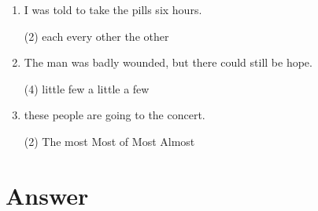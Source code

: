\begin{enumerate}
\item I was told to take the pills  \ttu six hours.
  \begin{tasks}(2)
    \task each \task every \task other \task the other
  \end{tasks}


\item The man was badly wounded, but there could still be  \ttu  hope.
  \begin{tasks}(4)
    \task little \task few \task a little \task a few
  \end{tasks}

\item  \ttu  these people are going to the concert.
  \begin{tasks}(2)
    \task The most \task Most of \task Most \task Almost
  \end{tasks}

\end{enumerate}

\section{Answer}

